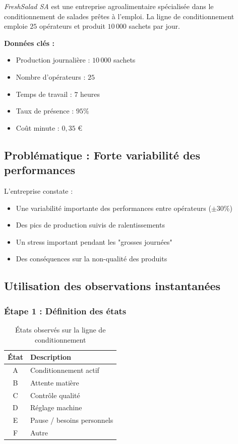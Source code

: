 \documentclass[a4paper,12pt]{article}
\begin{document}
\textit{FreshSalad SA} est une entreprise agroalimentaire spécialisée dans le conditionnement de salades prêtes à l'emploi. La ligne de conditionnement emploie $25$ opérateurs et produit $10\,000$ sachets par jour.

\textbf{Données clés :}
\begin{itemize}
    \item Production journalière : $10\,000$ sachets
    \item Nombre d'opérateurs : $25$
    \item Temps de travail : $7$ heures
    \item Taux de présence : $95\%$
    \item Coût minute : $0,35$ €
\end{itemize}

\subsection{Problématique : Forte variabilité des performances}

L'entreprise constate :
\begin{itemize}
    \item Une variabilité importante des performances entre opérateurs ($\pm 30\%$)
    \item Des pics de production suivis de ralentissements
    \item Un stress important pendant les "grosses journées"
    \item Des conséquences sur la non-qualité des produits
\end{itemize}

\subsection{Utilisation des observations instantanées}

\subsubsection{Étape 1 : Définition des états}

\begin{table}[ht]
\centering
\begin{tabular}{|c|l|}
\hline
\textbf{État} & \textbf{Description} \\
\hline
A & Conditionnement actif \\
B & Attente matière \\
C & Contrôle qualité \\
D & Réglage machine \\
E & Pause / besoins personnels \\
F & Autre \\
\hline
\end{tabular}
\caption{États observés sur la ligne de conditionnement}
\end{table}
\end{document}
